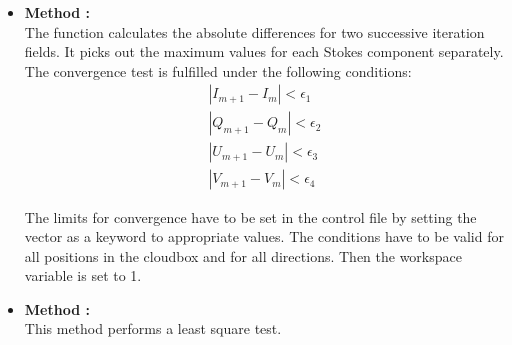 \begin{itemize}
\item {\bf Method :}\\
  The function calculates the absolute differences for two successive
  iteration fields. It picks out the maximum values for each Stokes
  component separately. The convergence test is fulfilled under the
  following conditions:
\begin{eqnarray}
|I_{m+1} - I_m| < \epsilon_1    \\
|Q_{m+1} - Q_m| < \epsilon_2    \\
|U_{m+1} - U_m| < \epsilon_3    \\
|V_{m+1} - V_m| < \epsilon_4     
\end{eqnarray}

The limits for convergence have to be set in the control file by
setting the vector  as a keyword to appropriate
values.  The conditions have to be valid for all positions in the
cloudbox and for all directions.  Then the workspace variable
 is set to 1.


\item {\bf Method :}\\
  This method performs a least square test.
\end{itemize}



 



